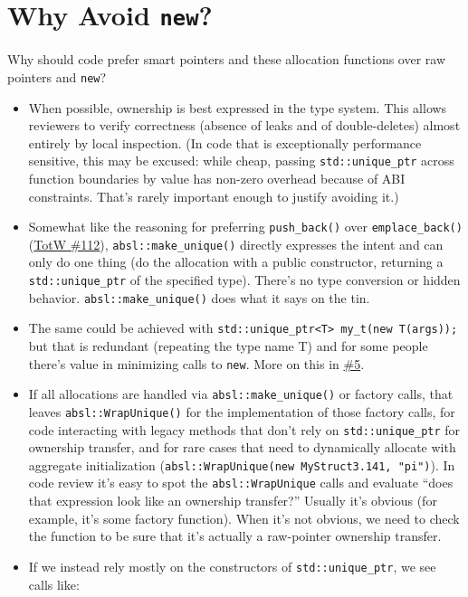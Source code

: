 \section{Why Avoid \texorpdfstring{\texttt{new}}{}?}
Why should code prefer smart pointers and these allocation functions over raw pointers and \texttt{new}?
\begin{itemize}
    \item When possible, ownership is best expressed in the type system. This allows reviewers to verify correctness (absence of leaks and of double-deletes) almost entirely by local inspection. (In code that is exceptionally performance sensitive, this may be excused: while cheap, passing \texttt{std::unique_ptr} across function boundaries by value has non-zero overhead because of ABI constraints. That’s rarely important enough to justify avoiding it.)
    \item Somewhat like the reasoning for preferring \texttt{push_back()} over \texttt{emplace_back()} (\hyperref[ch:tip-of-the-week-112]{TotW \#112}), \texttt{absl::make_unique()} directly expresses the intent and can only do one thing (do the allocation with a public constructor, returning a \texttt{std::unique_ptr} of the specified type). There’s no type conversion or hidden behavior. \texttt{absl::make_unique()} does what it says on the tin.
    \item The same could be achieved with \texttt{std::unique_ptr<T> my_t(new T(args));} but that is redundant (repeating the type name T) and for some people there’s value in minimizing calls to \texttt{new}. More on this in \hyperref[itm:5]{\#5}.
    \item If all allocations are handled via \texttt{absl::make_unique()} or factory calls, that leaves \texttt{absl::WrapUnique()} for the implementation of those factory calls, for code interacting with legacy methods that don’t rely on \texttt{std::unique_ptr} for ownership transfer, and for rare cases that need to dynamically allocate with aggregate initialization (\texttt{absl::WrapUnique(new MyStruct{3.141, "pi"})}). In code review it’s easy to spot the \texttt{absl::WrapUnique} calls and evaluate \enquote{does that expression look like an ownership transfer?} Usually it’s obvious (for example, it’s some factory function). When it’s not obvious, we need to check the function to be sure that it’s actually a raw-pointer ownership transfer.
    \item \label{itm:5}If we instead rely mostly on the constructors of \texttt{std::unique_ptr}, we see calls like:

\end{itemize}

